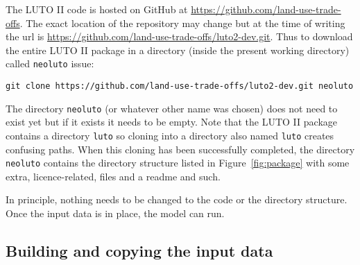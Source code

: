 \documentclass[12pt,a4paper,twoside]{article}
\begin{document}
The LUTO II code is hosted on GitHub at \url{https://github.com/land-use-trade-offs}. The exact location of the repository may change but at the time of writing the url is \url{https://github.com/land-use-trade-offs/luto2-dev.git}. Thus to download the entire LUTO II package in a directory (inside the present working directory) called \texttt{neoluto} issue:
\begin{verbatim}
git clone https://github.com/land-use-trade-offs/luto2-dev.git neoluto
\end{verbatim}
The directory \texttt{neoluto} (or whatever other name was chosen) does not need to exist yet but if it exists it needs to be empty. Note that the LUTO II package contains a directory \texttt{luto} so cloning into a directory also named \texttt{luto} creates confusing paths. When this cloning has been successfully completed, the directory \texttt{neoluto} contains the directory structure listed in Figure~\ref{fig:package} with some extra, licence-related, files and a readme and such.

In principle, nothing needs to be changed to the code or the directory structure. Once the input data is in place, the model can run.

\subsection{Building and copying the input data}\label{subsec:dataprep}
\end{document}
